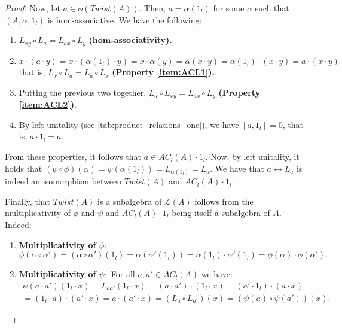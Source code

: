 \documentclass[12pt]{article}
\begin{document}
\begin{proof}
			
			Now, let $a\in\phi(Twist(A))$. Then, $a=\alpha(1_l)$ for some $\alpha$ such that $(A,\alpha,1_l)$ is hom-associative. We have the following:
			\begin{enumerate}
				\item $L_{xy}\circ L_a=L_{ax}\circ L_y$ \textbf{(hom-associativity).}
				\item $x\cdot (a\cdot y)=x\cdot (\alpha(1_l)\cdot y)=x\cdot \alpha(y)=\alpha(x\cdot y)=\alpha(1_l)\cdot (x\cdot y){=}a\cdot (x\cdot y)$ that is, $L_x\circ L_a=L_a\circ L_x$ \textbf{(Property \ref{item:ACL1}).}
				\item Putting the previous two together, $L_a\circ L_{xy}=L_{ax}\circ L_y$ \textbf{(Property \ref{item:ACL2})}.
				\item By left unitality (see \cref{tab:product_relations_one}), we have $[a,1_l]=0$, that is, $a\cdot 1_l=a$.
			\end{enumerate}
			From these properties, it follows that $a\in AC_l(A)\cdot 1_l$. Now, by left unitality, it holds that $(\psi\circ\phi)(\alpha)=\psi(\alpha(1_l))=L_{\alpha(1_l)}=L_a$. We have that $a\leftrightarrow L_a$ is indeed an isomorphism between $Twist(A)$ and $AC_l(A)\cdot 1_l$.
			
			Finally, that $Twist(A)$ is a subalgebra of $\mathcal{L}(A)$ follows from the multiplicativity of $\phi$ and $\psi$ and $AC_l(A)\cdot 1_l$ being itself a subalgebra of $A$. Indeed:
			\begin{enumerate}[label=,leftmargin=*]
				\item \textbf{Multiplicativity of $\phi\colon$}
				\begin{equation*}
					\phi(\alpha\circ\alpha')=(\alpha\circ\alpha')(1_l)=\alpha(\alpha'(1_l))=\alpha(1_l)\cdot\alpha'(1_l)=\phi(\alpha)\cdot \phi(\alpha').
				\end{equation*}
				
				\item\textbf{Multiplicativity of $\psi\colon$} For all $a,a' \in AC_l(A)$ we have:
				\vspace{-0.25cm}
				\begin{multline*}
					\psi(a\cdot a')(1_l\cdot x)=L_{aa'}(1_l\cdot x)=(a\cdot a')\cdot (1_l\cdot x)=(a'\cdot 1_l)\cdot (a\cdot x)\\
					=(1_l\cdot a)\cdot (a'\cdot x)
					=a\cdot (a'\cdot x)=(L_{a}\circ L_{a'})(x)=\left(\psi(a)\circ\psi(a')\right)(x).
				\end{multline*}
			\end{enumerate}


\end{proof}
\end{document}
